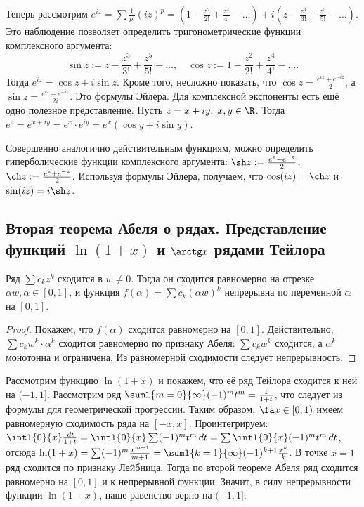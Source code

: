 \documentclass[a4paper]{article}
\begin{document}
Теперь рассмотрим $e^{iz}=\sum \frac{1}{p!}(iz)^p=(1-\frac{z^2}{2!}+
\frac{z^4}{4!}-\dots)+i(z-\frac{z^3}{3!}+\frac{z^5}{5!}-\dots)$.
Это наблюдение позволяет определить тригонометрические функции комплексного аргумента:
$$\sin z := z-\frac{z^3}{3!}+\frac{z^5}{5!}-\dots, \quad \cos z :=1-\frac{z^2}{2!}+\frac{z^4}{4!}-\dots.$$
Тогда $e^{iz}=\cos z + i\sin z$. Кроме того, несложно показать, что
$\cos z = \frac{e^{iz}+e^{-iz}}{2}$, а $\sin z = \frac{e^{iz}-e^{-iz}}{2i}$. Это формулы Эйлера.
Для комплексной экспоненты есть ещё одно полезное представление. Пусть $z=x+iy, \; x,y \in \R$.
Тогда $e^z=e^{x+iy}=e^x\cdot e^{iy}=e^x(\cos y + i \sin y)$.

Совершенно аналогично действительным функциям, можно определить гиперболические функции комплексного аргумента:
$\sh z := \frac{e^z-e^{-z}}{2}$, $\ch z := \frac{e^z+e^{-z}}{2}$. Используя формулы Эйлера, получаем, что
$\cos (iz)=\ch z$ и $\sin (iz) = i\sh z$.

\subsection{Вторая теорема Абеля о рядах. Представление функций $\ln(1+x)$ и $\arctg x$ рядами Тейлора}

\begin{theorem}
Ряд $\sum c_kz^k$ сходится в $w \neq 0$. Тогда он сходится равномерно на отрезке $\alpha w, \alpha \in [0,1]$,
и функция $f(\alpha) = \sum c_k (\alpha w)^k$ непрерывна по переменной $\alpha$ на $[0,1]$.
\end{theorem}
\begin{proof}
Покажем, что $f(\alpha)$ сходится равномерно на $[0,1]$. Действительно,
$\sum c_kw^k \cdot \alpha^k$ сходится равномерно по признаку Абеля:
$\sum c_kw^k$ сходится, а $\alpha^k$ монотонна и ограничена. Из равномерной сходимости следует непрерывность.
\end{proof}

Рассмотрим функцию $\ln(1+x)$ и покажем, что её ряд Тейлора сходится к ней на $(-1,1]$. Рассмотрим
ряд $\suml{m=0}{\infty}(-1)^mt^m=\frac{1}{1+t}$, что следует из формулы для геометрической
прогрессии. Таким образом, $\fa x \in [0,1)$ имеем равномерную сходимость ряда на $[-x,x]$.
Проинтегрируем: $\intl{0}{x}\frac{\,d t}{1+t}=\intl{0}{x}\sum (-1)^mt^m\,d t=\sum
\intl{0}{x}(-1)^mt^m\,d t$, отсюда $\ln(1+x)=\sum
(-1)^m\frac{x^{m+1}}{m+1}=\suml{k=1}{\infty}(-1)^{k+1}\frac{x^k}{k}$. В точке $x=1$ ряд сходится по
признаку Лейбница. Тогда по второй теореме Абеля ряд сходится равномерно на $[0,1]$ и к непрерывной
функции. Значит, в силу непрерывности функции $\ln (1+x)$, наше равенство верно на $(-1,1]$.
\end{document}
